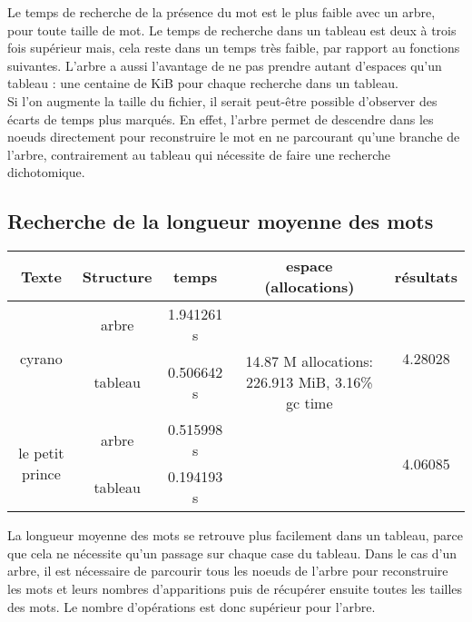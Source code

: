 \documentclass[a4paper,12pt]{article}
\begin{document}
Le temps de recherche de la présence du mot est le plus faible avec un arbre, pour toute taille de mot. Le temps de recherche dans un tableau est deux à trois fois supérieur mais, cela reste dans un temps très faible, par rapport au fonctions suivantes. L'arbre a aussi l'avantage de ne pas prendre autant d'espaces qu'un tableau : une centaine de KiB pour chaque recherche dans un tableau.\\
Si l'on augmente la taille du fichier, il serait peut-être possible d'observer des écarts de temps plus marqués. En effet, l'arbre permet de descendre dans les noeuds directement pour reconstruire le mot en ne parcourant qu'une branche de l'arbre, contrairement au tableau qui nécessite de faire une recherche dichotomique.


\subsection{Recherche de la longueur moyenne des mots}
\begin{center}
  \begin{tabular}{|c|c|c|c|c|}
    \hline
    Texte & Structure & temps & espace (allocations) & résultats\\
    \hline
    \multirow{2}{*}{cyrano} & arbre & 1.941261 s &  & \multirow{2}{*}{4.28028}\\
        \cline{2-4}
    & tableau & 0.506642 s & 14.87 M allocations: 226.913 MiB, 3.16\% gc time & \\
    \hline
    \multirow{2}{*}{le petit prince} & arbre & 0.515998 s & & \multirow{2}{*}{4.06085}\\
        \cline{2-4}
    & tableau & 0.194193 s & & \\
    \hline
  \end{tabular}
\end{center}


La longueur moyenne des mots se retrouve plus facilement dans un tableau, parce que cela ne nécessite qu'un passage sur chaque case du tableau. Dans le cas d'un arbre, il est nécessaire de parcourir tous les noeuds de l'arbre pour reconstruire les mots et leurs nombres d'apparitions puis de récupérer ensuite toutes les tailles des mots. Le nombre d'opérations est donc supérieur pour l'arbre.
\end{document}
